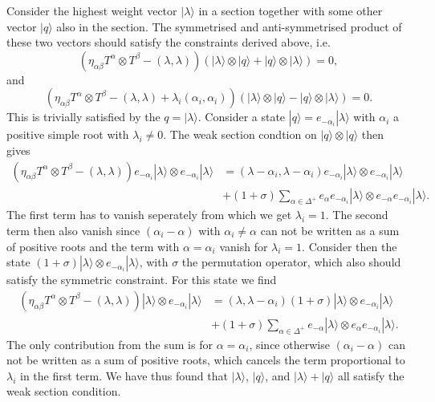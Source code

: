 Consider the highest weight vector $|\lambda\rangle$ in a section together with some other vector $|q\rangle$ also in the section. The symmetrised and anti-symmetrised product of these two vectors should satisfy the constraints derived above, i.e.\
\begin{equation}\label{eq:SectSym}
    \left(\eta_{\alpha\beta}T^\alpha\otimes T^\beta-(\lambda,\lambda)\right)\left(|\lambda\rangle\otimes|q\rangle+|q\rangle\otimes|\lambda\rangle\right)=0,
\end{equation}
and 
\begin{equation}
    \left(\eta_{\alpha\beta}T^\alpha\otimes T^\beta-(\lambda,\lambda)+\lambda_i(\alpha_i,\alpha_i)\right)\left(|\lambda\rangle\otimes|q\rangle-|q\rangle\otimes|\lambda\rangle\right)=0.
\end{equation}
This is trivially satisfied by the $q=|\lambda\rangle$. Consider a state $|q\rangle = e_{-\alpha_i}|\lambda\rangle$ with $\alpha_i$ a positive simple root with $\lambda_i\neq 0$. The weak section condtion on $|q\rangle\otimes|q\rangle$ then gives 
\begin{equation}
    \begin{aligned}
    \left(\eta_{\alpha\beta}T^\alpha\otimes T^\beta-(\lambda,\lambda)\right)e_{-\alpha_i}|\lambda\rangle \otimes e_{-\alpha_i}|\lambda\rangle &= (\lambda-\alpha_i,\lambda-\alpha_i)e_{-\alpha_i}|\lambda\rangle\otimes e_{-\alpha_i}|\lambda\rangle \\
    &+(1+\sigma)\sum_{\alpha\in \Delta^+}e_\alpha e_{-\alpha_i}|\lambda\rangle\otimes e_{-\alpha}e_{-\alpha_i}|\lambda\rangle.
    \end{aligned}
\end{equation}
The first term has to vanish seperately from which we get $\lambda_i=1$. The second term then also vanish since $(\alpha_i-\alpha)$ with $\alpha_i\neq \alpha$ can not be written as a sum of positive roots and the term with $\alpha=\alpha_i$ vanish for $\lambda_i=1$. Consider then the state $(1+\sigma)|\lambda\rangle\otimes e_{-\alpha_i}|\lambda\rangle$, with $\sigma$ the permutation operator, which also should satisfy the symmetric constraint. For this state we find 
\begin{equation}
    \begin{aligned}
    \left(\eta_{\alpha\beta}T^\alpha\otimes T^\beta-(\lambda,\lambda)\right)|\lambda\rangle \otimes e_{-\alpha_i}|\lambda\rangle &= (\lambda,\lambda-\alpha_i)(1+\sigma)|\lambda\rangle\otimes e_{-\alpha_i}|\lambda\rangle\\
    &+(1+\sigma)\sum_{\alpha\in\Delta^+}e_{-\alpha}|\lambda\rangle\otimes e_{\alpha}e_{-\alpha_i}|\lambda\rangle. 
    \end{aligned}
\end{equation}
The only contribution from the sum is for $\alpha=\alpha_i$, since otherwise $(\alpha_i-\alpha)$ can not be written as a sum of positive roots, which cancels the term proportional to $\lambda_i$ in the first term. We have thus found that $|\lambda\rangle$, $|q\rangle$, and $|\lambda\rangle+|q\rangle$ all satisfy the weak section condition. 

